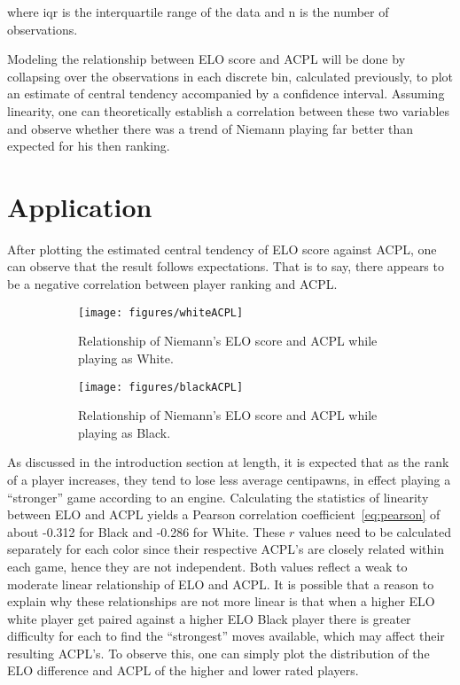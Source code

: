 \documentclass[12pt, letterpaper, titlepage]{article}
\begin{document}
where iqr is the interquartile range of the data and n is the number of observations.

Modeling the relationship between ELO score and ACPL will be done by collapsing over the observations in each discrete bin, calculated previously, to plot an estimate of central tendency accompanied by a confidence interval. Assuming linearity, one can theoretically establish a correlation between these two variables and observe whether there was a trend of Niemann playing far better than expected for his then ranking.

\section{Application}
\label{sec:app}

After plotting the estimated central tendency of ELO score against ACPL, one can observe that the result follows expectations. That is to say, there appears to be a negative correlation between player ranking and ACPL.

\begin{figure}[!htb]
    \centering
    \begin{subfigure}{.5\textwidth}
      \centering
      \texttt{[image: figures/whiteACPL]}
      \caption{Relationship of Niemann's ELO score and ACPL while playing as White.}
      \label{fig:sub1}
    \end{subfigure}
    \begin{subfigure}{.5\textwidth}
      \centering
      \texttt{[image: figures/blackACPL]}
      \caption{Relationship of Niemann's ELO score and ACPL while playing as Black.}
      \label{fig:sub2}
    \end{subfigure}
    \caption{}
    \label{fig:test}
\end{figure}

As discussed in the introduction section at length, it is expected that as the rank of a player increases, they tend to lose less average centipawns, in effect playing a “stronger” game according to an engine. Calculating the statistics of linearity between ELO and ACPL yields a Pearson correlation coefficient~\ref{eq:pearson} of about -0.312 for Black and -0.286 for White. These \begin{math}r\end{math} values need to be calculated separately for each color since their respective ACPL's are closely related within each game, hence they are not independent. Both values reflect a weak to moderate linear relationship of ELO and ACPL. It is possible that a reason to explain why these relationships are not more linear is that when a higher ELO white player get paired against a higher ELO Black player there is greater difficulty for each to find the “strongest” moves available, which may affect their resulting ACPL's. To observe this, one can simply plot the distribution of the ELO difference and ACPL of the higher and lower rated players.
\end{document}
